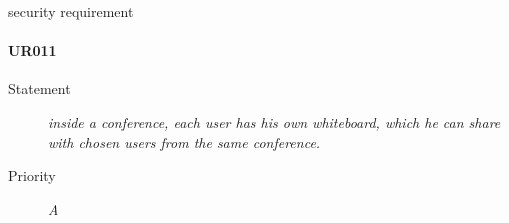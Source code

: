 security requirement
\paragraph{UR011}
\begin{description}
  \item [Statement] 
    \textit{inside a conference, each user has his own whiteboard, which he can share with chosen users from the same conference.}
  \item [Priority] \textit{A}
\end{description}


